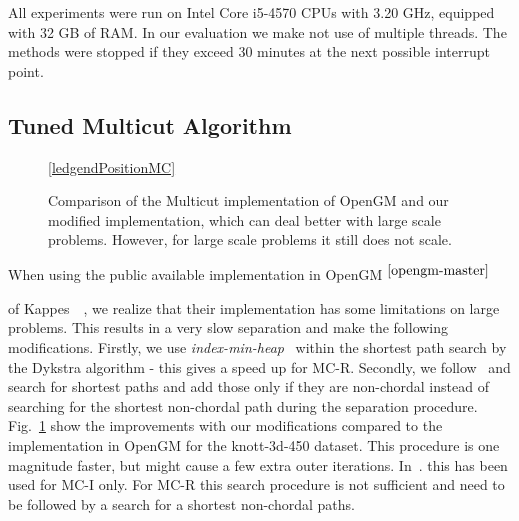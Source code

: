 \documentclass[10pt,twocolumn,letterpaper]{article}
\newcommand{\footref}[1]{%
    $^{\ref{#1}}$%
}
\theoremstyle{definition}
\begin{document}
All experiments were run on Intel Core i5-4570 CPUs
with 3.20 GHz, equipped with 32 GB of RAM.
In our evaluation we make not use of multiple threads.
The methods were stopped if they exceed 30 minutes at the next possible interrupt point.

\subsection{Tuned Multicut Algorithm}\label{sec:tunedMC} 
 \begin{figure}[t]
    \centering
  \begin{center}
  \hypersetup{linkcolor = black}
  \ref{ledgendPositionMC}
  \hypersetup{linkcolor = red}
  \end{center}
    \caption{Comparison of the Multicut implementation of OpenGM and 
    our modified implementation, which can deal better with large scale problems. 
    However, for large scale problems it still does not scale.}
    \label{fig:at:knott-450b}
  \end{figure}
When using the  public available implementation in OpenGM\footref{opengm-master}
of Kappes~\etal~\cite{kappes_2013_arxiv}, we realize that their implementation has some limitations on large problems.
This results in a very slow separation and make the following modifications.
Firstly, we use \emph{index-min-heap}~\cite{Sedgewick-2011} within the shortest path search by the Dykstra algorithm - this gives a speed up for MC-R.
Secondly, we follow~\cite{kroeger_2012_eccv} and search for shortest paths and add those only if they are non-chordal instead of searching for the shortest non-chordal path
during the separation procedure. Fig.~\ref{fig:at:knott-450b} show the improvements with our modifications compared to the implementation in OpenGM for the knott-3d-450 dataset.
This procedure is one magnitude faster, but might cause a few extra outer iterations.
In~\cite{kroeger_2012_eccv}. this has been used for MC-I only. 
For MC-R this search procedure is not sufficient and need to be followed by a search for a shortest non-chordal paths.
\end{document}
